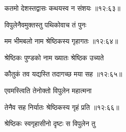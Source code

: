 {\devanagarifont कतमो देशस्तद्वासः कथयस्व न संशयः {॥१२:६३॥} \veg\dontdisplaylinenum }%

{\devanagarifont विपुलेनैवमुक्तस्तु पथिकोवाच तं पुनः \thinspace{\dandab} \dontdisplaylinenum }%


{\devanagarifont मम भीमबलो नाम श्रेष्ठिकस्य गृहागतः {॥१२:६४॥} \veg\dontdisplaylinenum }%

{\devanagarifont श्रेष्ठिकः पुण्डको नाम ख्यातः श्रेष्ठिक उच्यते \thinspace{\dandab} \dontdisplaylinenum }%
 

{\devanagarifont कौतुकं तव यद्यस्ति तदागच्छ मया सह {॥१२:६५॥} \veg\dontdisplaylinenum }%
 
{\devanagarifont एवमस्त्विति तेनोक्तो विपुलेन महात्मना \thinspace{\dandab} \dontdisplaylinenum }%


{\devanagarifont तेनैव सह निर्यातः श्रेष्ठिकस्य गृहं प्रति {॥१२:६६॥} \veg\dontdisplaylinenum }%

{\devanagarifont श्रेष्ठिकः स्वगृहासीनो दृष्टः स विपुलेन तु \thinspace{\dandab} \dontdisplaylinenum }%

